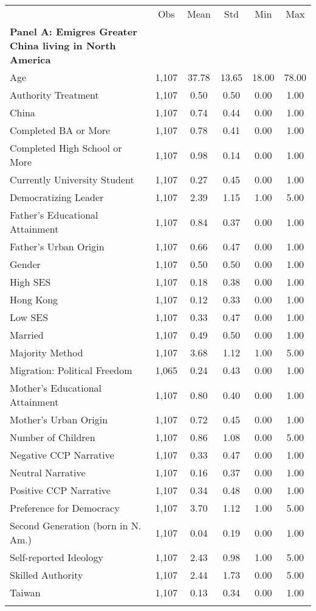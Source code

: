 \documentclass[]{article}
\begin{document}
\begin{adjustbox}{width=\columnwidth, totalheight=9.2in, center}
\begin{tabular}{lccccc}
\hline 
\noalign{\smallskip} & Obs & Mean & Std & Min & Max \\
\multirow{2}{5.5cm}{\textbf{Panel A: Emigres Greater China living in North America}} &&&&&
\\  \\ \hline
Age & 1,107 & 37.78 & 13.65 & 18.00 & 78.00\\
Authority Treatment & 1,107 & 0.50 & 0.50 & 0.00 & 1.00\\
China & 1,107 & 0.74 & 0.44 & 0.00 & 1.00\\
Completed BA or More & 1,107 & 0.78 & 0.41 & 0.00 & 1.00\\
Completed High School or More & 1,107 & 0.98 & 0.14 & 0.00 & 1.00\\
Currently University Student & 1,107 & 0.27 & 0.45 & 0.00 & 1.00\\
Democratizing Leader & 1,107 & 2.39 & 1.15 & 1.00 & 5.00\\
Father’s Educational Attainment & 1,107 & 0.84 & 0.37 & 0.00 & 1.00\\
Father's Urban Origin & 1,107 & 0.66 & 0.47 & 0.00 & 1.00\\
Gender & 1,107 & 0.50 & 0.50 & 0.00 & 1.00\\
High SES & 1,107 & 0.18 & 0.38 & 0.00 & 1.00\\
Hong Kong & 1,107 & 0.12 & 0.33 & 0.00 & 1.00\\
Low SES & 1,107 & 0.33 & 0.47 & 0.00 & 1.00\\
Married & 1,107 & 0.49 & 0.50 & 0.00 & 1.00\\
Majority Method & 1,107 & 3.68 & 1.12 & 1.00 & 5.00\\
Migration: Political Freedom & 1,065 & 0.24 & 0.43 & 0.00 & 1.00\\
Mother’s Educational Attainment & 1,107 & 0.80 & 0.40 & 0.00 & 1.00\\
Mother's Urban Origin & 1,107 & 0.72 & 0.45 & 0.00 & 1.00\\
Number of Children & 1,107 & 0.86 & 1.08 & 0.00 & 5.00\\
Negative CCP Narrative & 1,107 & 0.33 & 0.47 & 0.00 & 1.00\\
Neutral Narrative & 1,107 & 0.16 & 0.37 & 0.00 & 1.00\\
Positive CCP Narrative & 1,107 & 0.34 & 0.48 & 0.00 & 1.00\\
Preference for Democracy & 1,107 & 3.70 & 1.12 & 1.00 & 5.00\\
Second Generation (born in N. Am.) & 1,107 & 0.04 & 0.19 & 0.00 & 1.00\\
Self-reported Ideology & 1,107 & 2.43 & 0.98 & 1.00 & 5.00\\
Skilled Authority & 1,107 & 2.44 & 1.73 & 0.00 & 5.00\\
Taiwan & 1,107 & 0.13 & 0.34 & 0.00 & 1.00\\
\noalign{\smallskip}\hline 


\end{tabular}
\end{adjustbox}
\end{document}
